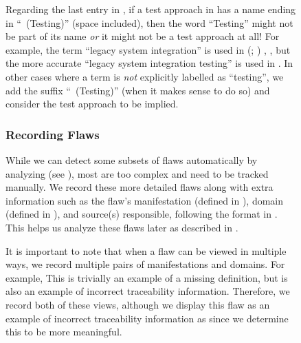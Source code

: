 \begin{figure}[h!]
    Regarding the last entry in , if a test approach in
    \ourApproachGlossary{} has a name ending in ``~(Testing)'' (space
    included), then the word ``Testing'' might not be part of its name
    \emph{or} it might not be a test approach at all! For example, the term
    ``legacy system integration'' is used in \ifnotpaper
        \citeauthor{Gerrard2000a} (\citeyear[pp.~12\==13, Tab.~2]{Gerrard2000a};
        \citeyear[Tab.~1]{Gerrard2000b})\else
        \cite[pp.~12\==13, Tab.~2]{Gerrard2000a},
        \cite[Tab.~1]{Gerrard2000b}\fi, but the more accurate
    ``legacy system integration testing'' is used in
    \citeyearpar[pp.~30\==31]{Gerrard2000b}. In other cases where a
    term is \emph{not} explicitly labelled as ``testing'', we add the
    suffix ``~(Testing)'' (when it makes sense to do so) and consider
    the test approach to be implied.

    \clearpage
    \subsubsection{Recording Flaws}\label{record-flaws}
    While we can detect some subsets of flaws automatically by analyzing
    \ourApproachGlossary{} (see ), most
    are too complex and need to be tracked manually. We record these more
    detailed flaws %
    along with extra information such as the flaw's manifestation (defined in
    ), domain (defined in ), and source(s)
    responsible, following the format in . This
    helps us analyze these flaws later as described in
    .

    \label{multi-view-flaws}
    It is important to note that when a flaw can be viewed in multiple ways,
    we record multiple pairs of manifestations and domains. For example,%
    \seeRefMissing*{} This is trivially an example of a missing definition,
    but is also an example of incorrect traceability information. Therefore,
    we record both of these views, although
    we display this flaw as an example of incorrect traceability information as
     since we determine this to be more meaningful.
\fi


\end{figure}
